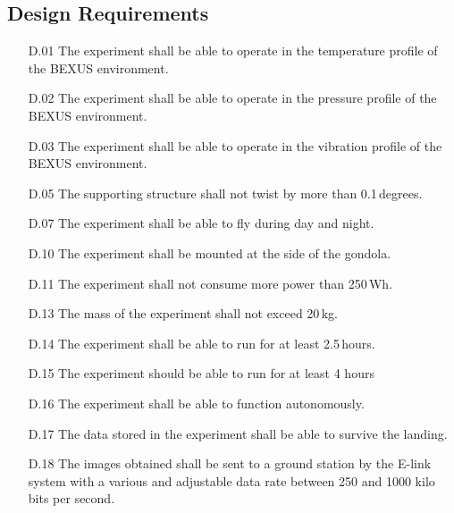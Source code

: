 \subsection{Design Requirements}

\begin{enumerate}[topsep=0pt,itemsep=-1ex,partopsep=1ex,parsep=1ex]
	\item[D.01] The experiment shall be able to operate in the temperature profile of the BEXUS environment.
	\item[D.02] The experiment shall be able to operate in the pressure profile of the BEXUS environment.
    \item[D.03] The experiment shall be able to operate in the vibration profile of the BEXUS environment.
	\item[D.05] The supporting structure shall not twist by more than 0.1\,degrees.
	\item[D.07] The experiment shall be able to fly during day and night.
	\item[D.10] The experiment shall be mounted at the side of the gondola.
	\item[D.11] The experiment shall not consume more power than 250\,Wh.
    \item[D.13] The mass of the experiment shall not exceed 20\,kg.
    \item[D.14] The experiment shall be able to run for at least 2.5\,hours.
    \item[D.15] The experiment should be able to run for at least 4 hours
    \item[D.16] The experiment shall be able to function autonomously.
    \item[D.17] The data stored in the experiment shall be able to survive the landing.
    \item[D.18] The images obtained shall be sent to a ground station by the E-link system with a various and adjustable data rate between 250 and 1000 kilo bits per second.
\end{enumerate}
